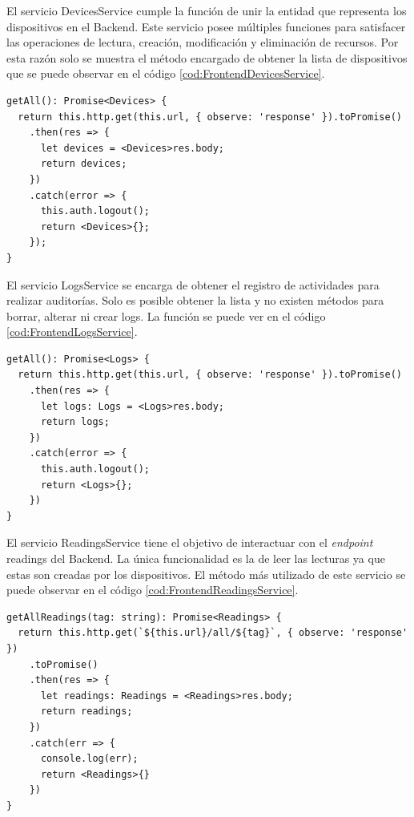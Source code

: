 El servicio DevicesService cumple la función de unir la entidad que representa los dispositivos en el Backend.
Este servicio posee múltiples funciones para satisfacer las operaciones de lectura, creación, modificación y eliminación de recursos.
Por esta razón solo se muestra el método encargado de obtener la lista de dispositivos que se puede observar en el código \ref{cod:FrontendDevicesService}.


\begin{lstlisting}[label=cod:FrontendDevicesService,caption=Obtención de la lista de dispositivos]
getAll(): Promise<Devices> {
  return this.http.get(this.url, { observe: 'response' }).toPromise()
    .then(res => {
      let devices = <Devices>res.body;
      return devices;
    })
    .catch(error => {
      this.auth.logout();
      return <Devices>{};
    });
}
\end{lstlisting}

El servicio LogsService se encarga de obtener el registro de actividades para realizar auditorías.
Solo es posible obtener la lista y no existen métodos para borrar, alterar ni crear logs. La función se puede ver en el código \ref{cod:FrontendLogsService}.

\begin{lstlisting}[label=cod:FrontendLogsService,caption=Obtención de la lista de logs]
getAll(): Promise<Logs> {
  return this.http.get(this.url, { observe: 'response' }).toPromise()
    .then(res => {
      let logs: Logs = <Logs>res.body;
      return logs;
    })
    .catch(error => {
      this.auth.logout();
      return <Logs>{};
    })
}
\end{lstlisting}

El servicio ReadingsService tiene el objetivo de interactuar con el \emph{endpoint} readings del Backend.
La única funcionalidad es la de leer las lecturas ya que estas son creadas por los dispositivos.
El método más utilizado de este servicio se puede observar en el código \ref{cod:FrontendReadingsService}.

\newpage

\begin{lstlisting}[label=cod:FrontendReadingsService,caption=Obtención de mediciones]
getAllReadings(tag: string): Promise<Readings> {
  return this.http.get(`${this.url}/all/${tag}`, { observe: 'response' })
    .toPromise()
    .then(res => {
      let readings: Readings = <Readings>res.body;
      return readings;
    })
    .catch(err => {
      console.log(err);
      return <Readings>{}
    })
}
\end{lstlisting}

